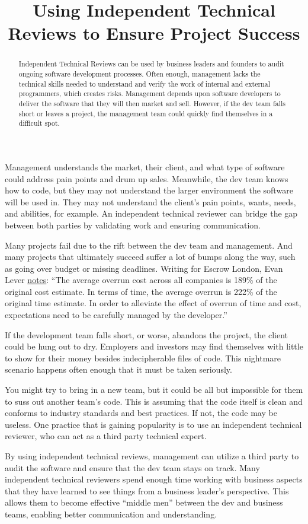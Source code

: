 \documentclass{main}
\title{Using Independent Technical Reviews to Ensure Project Success}
\begin{document}
\begin{abstract}
Independent Technical Reviews can be used by business leaders and founders to
audit ongoing software development processes. Often enough, management lacks the
technical skills needed to understand and verify the work of internal and
external programmers, which creates risks. Management  depends upon software
developers to deliver the software that they will then market and sell. However,
if the dev team falls short or leaves a project, the management team could
quickly find themselves in a difficult spot.
\end{abstract}

Management understands the market, their client, and what type of software could
address pain points and drum up sales. Meanwhile, the dev team knows how to
code, but they may not understand the larger environment the software will be
used in. They may not understand the client’s pain points, wants, needs, and
abilities, for example. An independent technical reviewer can bridge the gap
between both parties by validating work and ensuring communication.

Many projects fail due to the rift between the dev team and management. And many
projects that ultimately succeed suffer a lot of bumps along the way, such as
going over budget or missing deadlines. Writing for Escrow London,
Evan Lever \href{https://www.escrowlondon.co.uk/news/5-reasons-software-development-projects-fail/}{notes}:
``The average overrun cost across all companies is 189\% of the original cost
estimate. In terms of time, the average overrun is 222\% of the original time
estimate. In order to alleviate the effect of overrun of time and cost,
expectations need to be carefully managed by the developer.''

If the development team falls short, or worse, abandons the project, the client
could be hung out to dry. Employers and investors  may find themselves with
little to show for their money besides indecipherable files of code. This
nightmare scenario happens often enough that it must be taken seriously.

You might try to bring in a new team, but it could be all but impossible for
them to suss out another team’s code. This is assuming that the code itself is
clean and conforms to industry standards and best practices. If not, the code
may be useless. One practice that is gaining popularity is to use an independent
technical reviewer, who can act as a third party technical expert.

By using independent technical reviews, management can utilize a third party to
audit the software and ensure that the dev team stays on track. Many independent
technical reviewers spend enough time working with business aspects that they
have learned to see things from a business leader’s perspective. This allows
them to become effective “middle men” between the dev and business teams,
enabling better communication and understanding.
\end{document}
